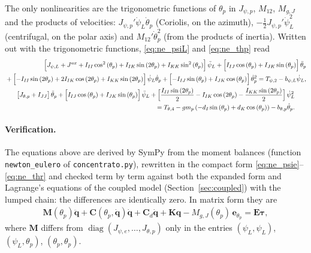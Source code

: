 \documentclass[10pt,a4paper]{article}
\numberwithin{equation}{section}
\begin{document}
The only nonlinearities are the trigonometric functions of $\theta_p$ in $J_{\psi,p}$, $M_{12}$, $M_{g,J}$ and the products of velocities: $J_{\psi,p}'\dot\psi_L\dot\theta_p$ (Coriolis, on the azimuth), $-\tfrac12 J_{\psi,p}'\dot\psi_L^2$ (centrifugal, on the polar axis) and $M_{12}'\dot\theta_p^2$ (from the products of inertia). Written out with the trigonometric functions, \eqref{eq:ne_psiL} and \eqref{eq:ne_thp} read
\begin{gather}
\begin{split}
\Bigl[J_{\psi,L} + J^{ax} + I_{II} \cos^{2}{\left(\theta_{p} \right)} + I_{IK} \sin{\left(2 \theta_{p} \right)} + I_{KK} \sin^{2}{\left(\theta_{p} \right)}\Bigr]\,\ddot\psi_L + \Bigl[I_{IJ} \cos{\left(\theta_{p} \right)} + I_{JK} \sin{\left(\theta_{p} \right)}\Bigr]\,\ddot\theta_p \\
{}+ \Bigl[- I_{II} \sin{\left(2 \theta_{p} \right)} + 2 I_{IK} \cos{\left(2 \theta_{p} \right)} + I_{KK} \sin{\left(2 \theta_{p} \right)}\Bigr]\,\dot\psi_L\dot\theta_p + \Bigl[- I_{IJ} \sin{\left(\theta_{p} \right)} + I_{JK} \cos{\left(\theta_{p} \right)}\Bigr]\,\dot\theta_p^2 = T_{\psi,2} - b_{\psi,L}\dot\psi_L,
\end{split}\label{eq:ne_psiL_esteso}\\
\begin{split}
\bigl[J_{\theta,p} + I_{JJ}\bigr]\,\ddot\theta_p + \Bigl[I_{IJ} \cos{\left(\theta_{p} \right)} + I_{JK} \sin{\left(\theta_{p} \right)}\Bigr]\,\ddot\psi_L + \Bigl[\frac{I_{II} \sin{\left(2 \theta_{p} \right)}}{2} - I_{IK} \cos{\left(2 \theta_{p} \right)} - \frac{I_{KK} \sin{\left(2 \theta_{p} \right)}}{2}\Bigr]\,\dot\psi_L^2 \\
{}= T_{\theta,4} - g m_{p} \left(- d_{I} \sin{\left(\theta_{p} \right)} + d_{K} \cos{\left(\theta_{p} \right)}\right) - b_{\theta,p}\dot\theta_p.
\end{split}\label{eq:ne_thp_esteso}
\end{gather}
\paragraph{Verification.} The equations above are derived by SymPy from the moment balances (function \texttt{newton\_eulero} of \texttt{concentrato.py}), rewritten in the compact form \eqref{eq:ne_psie}--\eqref{eq:ne_thr} and checked term by term against both the expanded form and Lagrange's equations of the coupled model (Section~\ref{sec:coupled}) with the lumped chain: the differences are identically zero. In matrix form they are
\begin{gather}
\mathbf M(\theta_p)\ddot{\mathbf q} + \mathbf C(\theta_p, \dot{\mathbf q})\dot{\mathbf q} + \mathbf C_d\dot{\mathbf q} + \mathbf K\mathbf q - M_{g,J}(\theta_p)\,\mathbf e_{\theta_p} = \mathbf E\boldsymbol\tau,\label{eq:ne_matrix}
\end{gather}
where $\mathbf M$ differs from $\operatorname{diag}(J_{\psi,e}, \dots, J_{\theta,p})$ only in the entries $(\psi_L,\psi_L)$, $(\psi_L,\theta_p)$, $(\theta_p,\theta_p)$.
\end{document}
